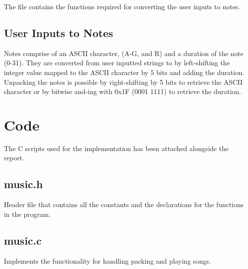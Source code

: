 \documentclass[usletter, 12pt]{article}
\begin{document}
    The  file contains the functions required for converting the user inputs to notes.

        \subsection{User Inputs to Notes}

        Notes comprise of an ASCII character, (A-G, and R) and a duration of the note (0-31). They are converted from user inputted strings to  by left-shifting the integer value mapped to the ASCII character by 5 bits and adding the duration. \\
        Unpacking the notes is possible by right-shifting by 5 bits to retrieve the ASCII character or by bitwise and-ing with 0x1F (0001 1111) to retrieve the duration.

    \section{Code}

        The C scripts used for the implementation has been attached alongside the report.

        \subsection{music.h}
        Header file that contains all the constants and the declarations for the functions in the program.

        \subsection{music.c}
        Implements the functionality for handling packing and playing songs.
\end{document}
